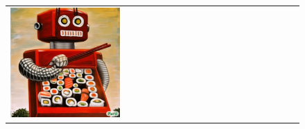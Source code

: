\begin{figure}[ht!]
\begin{adjustwidth}{-0.8in}{-0.5in}
\begin{tabular}{cccccccccccccccccccc}
\multicolumn{2}{c}{\includegraphics[width=\threebythreecolwidth\textwidth]{figures/cherries/sushi_robot_5.jpg}} \\




\end{tabular}
\end{adjustwidth}
\end{figure}
